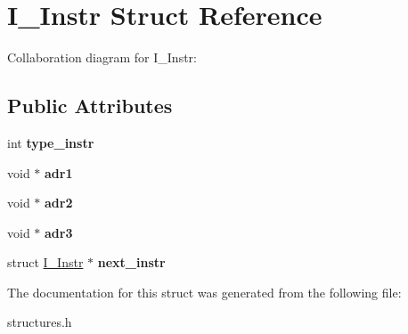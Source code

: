 \hypertarget{structI__Instr}{}\section{I\+\_\+\+Instr Struct Reference}
\label{structI__Instr}


Collaboration diagram for I\+\_\+\+Instr\+:
\subsection*{Public Attributes}
\begin{DoxyCompactItemize}
\item 
int {\bfseries type\+\_\+instr}\hypertarget{structI__Instr_a9b06c5d4a207c3a7fb042659d5b3f7db}{}\label{structI__Instr_a9b06c5d4a207c3a7fb042659d5b3f7db}

\item 
void $\ast$ {\bfseries adr1}\hypertarget{structI__Instr_a4f4318412398660c90bfd829302d6d40}{}\label{structI__Instr_a4f4318412398660c90bfd829302d6d40}

\item 
void $\ast$ {\bfseries adr2}\hypertarget{structI__Instr_a724bd5c33289dc42cb4c771e860353ae}{}\label{structI__Instr_a724bd5c33289dc42cb4c771e860353ae}

\item 
void $\ast$ {\bfseries adr3}\hypertarget{structI__Instr_ac2cca07784ad265ada9bcdcbf0d1c243}{}\label{structI__Instr_ac2cca07784ad265ada9bcdcbf0d1c243}

\item 
struct \hyperlink{structI__Instr}{I\+\_\+\+Instr} $\ast$ {\bfseries next\+\_\+instr}\hypertarget{structI__Instr_a943b98c8500854fa836c70843f50342f}{}\label{structI__Instr_a943b98c8500854fa836c70843f50342f}

\end{DoxyCompactItemize}


The documentation for this struct was generated from the following file\+:\begin{DoxyCompactItemize}
\item 
structures.\+h\end{DoxyCompactItemize}
